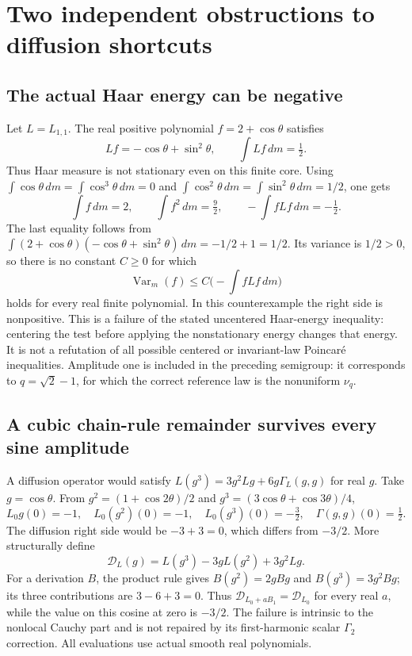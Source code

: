 \documentclass[11pt]{article}
\begin{document}
\section{Two independent obstructions to diffusion shortcuts}
\subsection{The actual Haar energy can be negative}
Let $L=L_{1,1}$. The real positive polynomial $f=2+\cos\theta$
satisfies
\[
 Lf=-\cos\theta+\sin^2\theta,
 \qquad \int Lf\,dm=\tfrac12.
\]
Thus Haar measure is not stationary even on this finite core. Using
$\int\cos\theta\,dm=\int\cos^3\theta\,dm=0$ and
$\int\cos^2\theta\,dm=\int\sin^2\theta\,dm=1/2$, one gets
\[
 \int f\,dm=2,\qquad \int f^2\,dm=\tfrac92,\qquad
 -\int fLf\,dm=-\tfrac12.
\]
The last equality follows from
$\int(2+\cos\theta)(-\cos\theta+\sin^2\theta)\,dm
=-1/2+1=1/2$. Its variance is $1/2>0$, so there is no
constant $C\geq0$ for which
\[
 \operatorname{Var}_m(f)\leq C\bigl(-\!\int fLf\,dm\bigr)
\]
holds for every real finite polynomial. In this counterexample
the right side is nonpositive. This is a failure of the stated
uncentered Haar-energy inequality: centering the test before
applying the nonstationary energy changes that energy. It is not
a refutation of all possible centered or invariant-law Poincar\'e
inequalities. Amplitude one is included in the preceding semigroup:
it corresponds to $q=\sqrt2-1$, for which the correct reference
law is the nonuniform $\nu_q$.

\subsection{A cubic chain-rule remainder survives every sine amplitude}
A diffusion operator would satisfy
$L(g^3)=3g^2Lg+6g\Gamma_L(g,g)$ for real $g$.
Take $g=\cos\theta$. From $g^2=(1+\cos2\theta)/2$ and
$g^3=(3\cos\theta+\cos3\theta)/4$,
\[
 L_0g(0)=-1,\quad L_0(g^2)(0)=-1,\quad
 L_0(g^3)(0)=-\tfrac32,\quad \Gamma(g,g)(0)=\tfrac12.
\]
The diffusion right side would be $-3+3=0$, which differs from
$-3/2$. More structurally define
\[
 \mathcal D_L(g)=L(g^3)-3gL(g^2)+3g^2Lg.
\]
For a derivation $B$, the product rule gives
$B(g^2)=2gBg$ and $B(g^3)=3g^2Bg$; its three contributions
are $3-6+3=0$. Thus $\mathcal D_{L_0+aB_1}=\mathcal D_{L_0}$
for every real $a$, while the value on this cosine at zero is
$-3/2$. The failure is intrinsic to the nonlocal Cauchy part and
is not repaired by its first-harmonic scalar $\Gamma_2$ correction.
All evaluations use actual smooth real polynomials.
\end{document}
